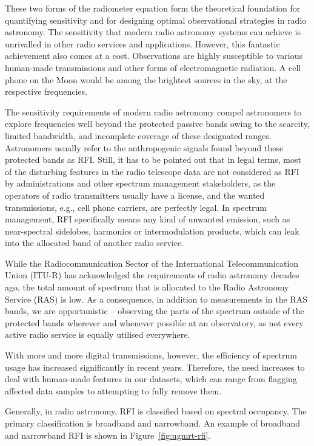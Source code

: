 These two forms of the radiometer equation form the theoretical foundation for quantifying sensitivity and for designing optimal observational strategies in radio astronomy. The sensitivity that modern radio astronomy systems can achieve is unrivalled in other radio services and applications. However, this fantastic achievement also comes at a cost. Observations are highly susceptible to various human-made transmissions and other forms of electromagnetic radiation. A cell phone on the Moon would be among the brightest sources in the sky, at the respective frequencies. 

The sensitivity requirements of modern radio astronomy compel astronomers to explore frequencies well beyond the protected passive bands owing to the scarcity, limited bandwidth, and incomplete coverage of these designated ranges. Astronomers usually refer to the anthropogenic signals found beyond these protected bands as RFI. Still, it has to be pointed out that in legal terms, most of the disturbing features in the radio telescope data are not considered as RFI by administrations and other spectrum management stakeholders, as the operators of radio transmitters usually have a license, and the wanted transmissions, e.g., cell phone carriers, are perfectly legal. In spectrum management, RFI specifically means any kind of unwanted emission, such as near-spectral sidelobes, harmonics or intermodulation products, which can leak into the allocated band of another radio service.

While the Radiocommunication Sector of the International Telecommunication Union (ITU-R) has acknowledged the requirements of radio astronomy decades ago, the total amount of spectrum that is allocated to the Radio Astronomy Service (RAS) is low. As a consequence, in addition to measurements in the RAS bands, we are opportunistic -- observing the parts of the spectrum outside of the protected bands wherever and whenever possible at an observatory, as not every active radio service is equally utilised everywhere. 

With more and more digital transmissions, however, the efficiency of spectrum usage has increased significantly in recent years. Therefore, the need increases to deal with human-made features in our datasets, which can range from flagging affected data samples to attempting to fully remove them.

Generally, in radio astronomy, RFI is classified based on spectral occupancy. The primary classification is broadband and narrowband. An example of broadband and narrowband RFI is shown in Figure~\ref{fig:ugmrt-rfi}.

